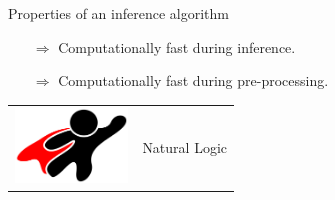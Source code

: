 \documentclass[hyperref]{beamer}
\begin{document}
\begin{frame}[noframenumbering]{}
\begin{center}
  \teaserBlindInferenceNaturalOrder
\end{center}
\end{frame}
\begin{frame}[noframenumbering]{}
\begin{center}
  \teaserBlindInference
\end{center}
\end{frame}

\begin{frame}{Properties of an inference algorithm}
\begin{itemize}
  \item[$\Rightarrow$] Computationally fast during inference.
\end{itemize}
\pause
\vspace{0.5cm}

\begin{itemize}
  \item[$\Rightarrow$] Computationally fast during pre-processing.
\end{itemize}
\pause
\vspace{0.5cm}

\pause
\vspace{0.5cm}

\begin{center}
  \begin{tabular}{rl}
    \multicolumn{1}{m{3cm}}{\includegraphics[width=3cm]{../../img/superhero.pdf}} &
    \huge{Natural Logic}
  \end{tabular}
\end{center}
\end{frame}


\end{document}
